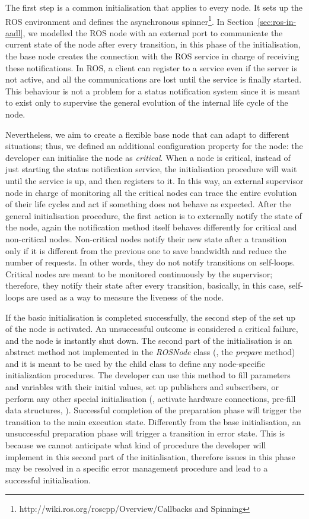 The first step is a common initialisation that applies to every node. It sets up the ROS environment and defines the asynchronous spinner\footnote{http://wiki.ros.org/roscpp/Overview/Callbacks and Spinning}. In Section~\ref{sec:ros-in-aadl}, we modelled the ROS node with an external port to communicate the current state of the node after every transition, in this phase of the initialisation, the base node creates the connection with the ROS service in charge of receiving these notifications. In ROS, a client can register to a service even if the server is not active, and all the communications are lost until the service is finally started. This behaviour is not a problem for a status notification system since it is meant to exist only to supervise the general evolution of the internal life cycle of the node.

Nevertheless, we aim to create a flexible base node that can adapt to different situations; thus, we defined an additional configuration property for the node: the developer can initialise the node as \textit{critical}. When a node is critical, instead of just starting the status notification service, the initialisation procedure will wait until the service is up, and then registers to it. In this way, an external supervisor node in charge of monitoring all the critical nodes can trace the entire evolution of their life cycles and act if something does not behave as expected. After the general initialisation procedure, the first action is to externally notify the state of the node, again the notification method itself behaves differently for critical and non-critical nodes. Non-critical nodes notify their new state after a transition only if it is different from the previous one to save bandwidth and reduce the number of requests. In other words, they do not notify transitions on self-loops. Critical nodes are meant to be monitored continuously by the supervisor; therefore, they notify their state after every transition, basically, in this case, self-loops are used as a way to measure the liveness of the node.

If the basic initialisation is completed successfully, the second step of the set up of the node is activated. An unsuccessful outcome is considered a critical failure, and the node is instantly shut down. The second part of the initialisation is an abstract method not implemented in the \textit{ROSNode} class (\ie, the \textit{prepare} method) and it is meant to be used by the child class to define any node-specific initialization procedures. The developer can use this method to fill parameters and variables with their initial values, set up publishers and subscribers, or perform any other special initialisation (\eg, activate hardware connections, pre-fill data structures, \etc). Successful completion of the preparation phase will trigger the transition to the main execution state. Differently from the base initialisation, an unsuccessful preparation phase will trigger a transition in error state. This is because we cannot anticipate what kind of procedure the developer will implement in this second part of the initialisation, therefore issues in this phase may be resolved in a specific error management procedure and lead to a successful initialisation.

